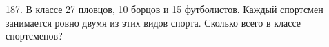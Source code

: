 187. В классе 27 пловцов, 10 борцов и 15 футболистов. Каждый спортсмен занимается ровно двумя из этих видов спорта. Сколько всего в классе спортсменов?\\
